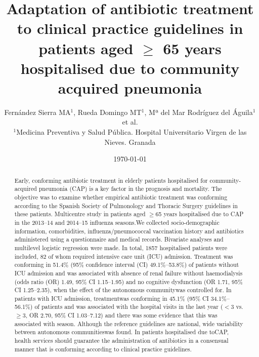 \documentclass[11pt, a4paper]{article}
\begin{document}
\sffamily

\title{Adaptation of antibiotic treatment to clinical
practice guidelines in patients aged $\geq$ 65 years
hospitalised due to community acquired pneumonia}

\author{Fernández Sierra MA$^{1}$, Rueda Domingo MT$^{1}$, Mª del Mar Rodríguez del Águila$^{1}$ et al.\\
\small$^{1}$Medicina Preventiva y Salud Pública. Hospital Universitario Virgen de las Nieves. Granada}

\date{\today}

\maketitle


\begin{abstract}
Early, conforming antibiotic treatment in elderly patients hospitalised for community-acquired pneumonia (CAP) is a key factor in the prognosis and mortality. The objective was to examine whether empirical antibiotic treatment was conforming according to the Spanish Society of Pulmonology and Thoracic Surgery guidelines in these patients. Multicentre study in patients aged $\geq$65 years hospitalised due to CAP in the 2013–14 and 2014–15 influenza seasons.We collected socio-demographic information, comorbidities, influenza/pneumococcal vaccination history and antibiotics administered using a questionnaire and medical records. Bivariate analyses and multilevel logistic regression were made. In total, 1857 hospitalised patients were included, 82 of whom required intensive care unit (ICU) admission. Treatment was conforming in 51.4\% (95\% confidence interval (CI) 49.1\%–53.8\%) of patients without ICU admission and was associated with absence of renal failure without haemodialysis (odds ratio (OR) 1.49, 95\% CI 1.15–1.95) and no cognitive dysfunction (OR 1.71, 95\% CI 1.25–2.35), when the effect of the autonomous communitywas controlled for. In patients with ICU admission, treatmentwas conforming in 45.1\% (95\% CI 34.1\%–56.1\%) of patients and was associated with the hospital visits in the last year ($<3$ vs. $\geq$3, OR 2.70, 95\% CI 1.03–7.12) and there was some evidence that this was associated with season. Although the reference guidelines are national, wide variability between autonomous communitieswas found. In patients hospitalised due toCAP, health services should guarantee the administration of antibiotics in a consensual manner that is conforming according to clinical practice guidelines.
\end{abstract}
\end{document}

